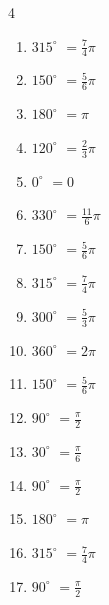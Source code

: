 \begin{multicols}{4}
\begin{enumerate}
  \item $\displaystyle 315^{\circ}$
        $\displaystyle =\frac{7}{4}\pi$

  \item $\displaystyle 150^{\circ}$
        $\displaystyle =\frac{5}{6}\pi$

  \item $\displaystyle 180^{\circ}$
        $\displaystyle =\pi$

  \item $\displaystyle 120^{\circ}$
        $\displaystyle =\frac{2}{3}\pi$

\columnbreak %

  \item $\displaystyle 0^{\circ}$
        $\displaystyle =0$

  \item $\displaystyle 330^{\circ}$
        $\displaystyle =\frac{11}{6}\pi$

  \item $\displaystyle 150^{\circ}$
        $\displaystyle =\frac{5}{6}\pi$

  \item $\displaystyle 315^{\circ}$
        $\displaystyle =\frac{7}{4}\pi$

  \item $\displaystyle 300^{\circ}$
        $\displaystyle =\frac{5}{3}\pi$

  \item $\displaystyle 360^{\circ}$
        $\displaystyle =2\pi$

  \item $\displaystyle 150^{\circ}$
        $\displaystyle =\frac{5}{6}\pi$

  \item $\displaystyle 90^{\circ}$
        $\displaystyle =\frac{\pi}{2}$

  \item $\displaystyle 30^{\circ}$
        $\displaystyle =\frac{\pi}{6}$

  \item $\displaystyle 90^{\circ}$
        $\displaystyle =\frac{\pi}{2}$

  \item $\displaystyle 180^{\circ}$
        $\displaystyle =\pi$

  \item $\displaystyle 315^{\circ}$
        $\displaystyle =\frac{7}{4}\pi$

  \item $\displaystyle 90^{\circ}$
        $\displaystyle =\frac{\pi}{2}$


\end{enumerate}
\end{multicols}
